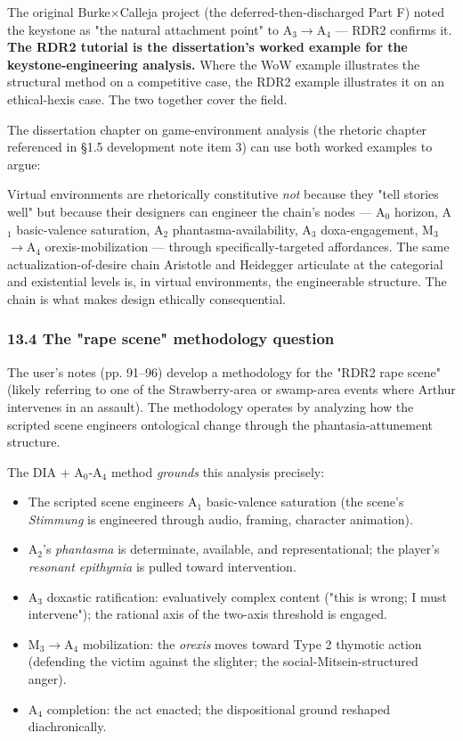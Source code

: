 \documentclass[11pt]{report}
\begin{document}
The original Burke$\times$\allowbreak Calleja project (the deferred-then-discharged Part F) noted the keystone as "the natural attachment point" to A$_3$$\rightarrow$\allowbreak A$_4$ — RDR2 confirms it. \textbf{The RDR2 tutorial is the dissertation's worked example for the keystone-engineering analysis.} Where the WoW example illustrates the structural method on a competitive case, the RDR2 example illustrates it on an ethical-hexis case. The two together cover the field.


The dissertation chapter on game-environment analysis (the rhetoric chapter referenced in §1.5 development note item 3) can use both worked examples to argue:


\begin{diabox}
Virtual environments are rhetorically constitutive \textit{not} because they "tell stories well" but because their designers can engineer the chain's nodes — A$_0$ horizon, A$_1$ basic-valence saturation, A$_2$ phantasma-availability, A$_3$ doxa-engagement, M$_3$$\rightarrow$\allowbreak A$_4$ orexis-mobilization — through specifically-targeted affordances. The same actualization-of-desire chain Aristotle and Heidegger articulate at the categorial and existential levels is, in virtual environments, the engineerable structure. The chain is what makes design ethically consequential.

\end{diabox}


\subsubsection{13.4 The "rape scene" methodology question}


The user's notes (pp. 91–96) develop a methodology for the "RDR2 rape scene" (likely referring to one of the Strawberry-area or swamp-area events where Arthur intervenes in an assault). The methodology operates by analyzing how the scripted scene engineers ontological change through the phantasia-attunement structure.


The DIA + A$_0$-A$_4$ method \textit{grounds} this analysis precisely:


\begin{itemize}
\item The scripted scene engineers A$_1$ basic-valence saturation (the scene's \textit{Stimmung} is engineered through audio, framing, character animation).
\item A$_2$'s \textit{phantasma} is determinate, available, and representational; the player's \textit{resonant epithymia} is pulled toward intervention.
\item A$_3$ doxastic ratification: evaluatively complex content ("this is wrong; I must intervene"); the rational axis of the two-axis threshold is engaged.
\item M$_3$$\rightarrow$\allowbreak A$_4$ mobilization: the \textit{orexis} moves toward Type 2 thymotic action (defending the victim against the slighter; the social-Mitsein-structured anger).
\item A$_4$ completion: the act enacted; the dispositional ground reshaped diachronically.
\end{itemize}
\end{document}
